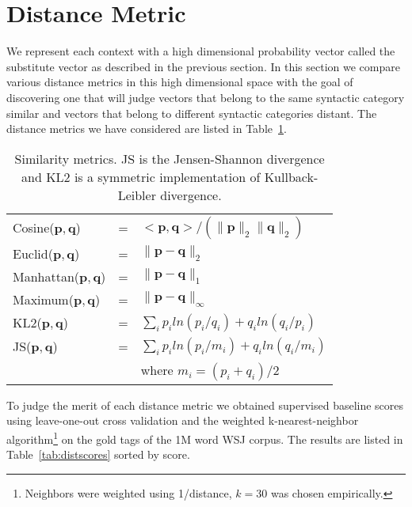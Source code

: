 \section{Distance Metric}
\label{sec:dist}

We represent each context with a high dimensional probability vector
called the substitute vector as described in the previous section.  In
this section we compare various distance metrics in this high
dimensional space with the goal of discovering one that will judge
vectors that belong to the same syntactic category similar and vectors
that belong to different syntactic categories distant.  The distance
metrics we have considered are listed in Table~\ref{tab:metrics}.

\begin{table}[ht] \centering
\small
\begin{tabular}{|lll|}
\hline
Cosine($\mathbf{p}, \mathbf{q}$) & = & $<\mathbf{p},\mathbf{q}> / (\|\mathbf{p}\|_{2} \|\mathbf{q}\|_{2})$ \\
Euclid($\mathbf{p}, \mathbf{q}$) & = & $\|\mathbf{p} - \mathbf{q}\|_{2}$ \\
Manhattan($\mathbf{p}, \mathbf{q}$) & = & $\|\mathbf{p} - \mathbf{q}\|_{1}$ \\
Maximum($\mathbf{p}, \mathbf{q}$) & = & $\|\mathbf{p} - \mathbf{q}\|_{\infty}$ \\
KL2($\mathbf{p}, \mathbf{q}$) & = & $\sum_i p_iln(p_i/q_i) + q_iln(q_i/p_i) $\\
JS($\mathbf{p}, \mathbf{q}$) & = & $\sum_i p_iln(p_i/m_i) + q_iln(q_i/m_i) $\\
& & where $m_i = (p_i + q_i) / 2$\\
\hline
\end{tabular}
\caption{Similarity metrics.  JS is the Jensen-Shannon divergence and
  KL2 is a symmetric implementation of Kullback-Leibler divergence.}
\label{tab:metrics}
\end{table}

To judge the merit of each distance metric we obtained supervised
baseline scores using leave-one-out cross validation and the weighted
k-nearest-neighbor algorithm\footnote{Neighbors were weighted using
  1/distance, $k=30$ was chosen empirically.} on the gold tags of the
1M word WSJ corpus.  The results are listed in
Table~\ref{tab:distscores} sorted by score.

